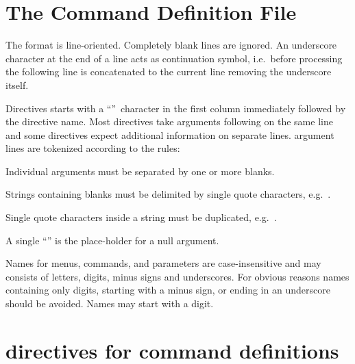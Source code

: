 \section{The Command Definition File}

The \CDF{} format is line-oriented.
Completely blank lines are ignored.
An underscore character at the end of a line acts as
continuation symbol, i.e.\ before processing
the following line is concatenated to the current line removing the
underscore itself.

Directives
starts with a ``\Lit{>}''~character in the first column
immediately followed by the directive name.
Most directives take arguments following on the same line and some
directives expect additional information on separate lines.
\CDF{} argument lines are tokenized according to the rules:
\begin{UL}
\item
Individual arguments must be separated by one or more blanks.
\item
Strings containing blanks must be delimited by single quote characters,
e.g.\ .
\item
Single quote characters inside a string must be duplicated,
e.g.\ .
\item
A single ``'' is the place-holder for a null argument.
\end{UL}

Names for menus, commands, and parameters
are case-insensitive and may consists of letters,
digits, minus signs and underscores.
For obvious reasons names containing only digits, starting with a
minus sign, or ending in an underscore should be avoided.
Names may start with a digit.

\section{\CDF{} directives for command definitions\label{basic-CDF}}

